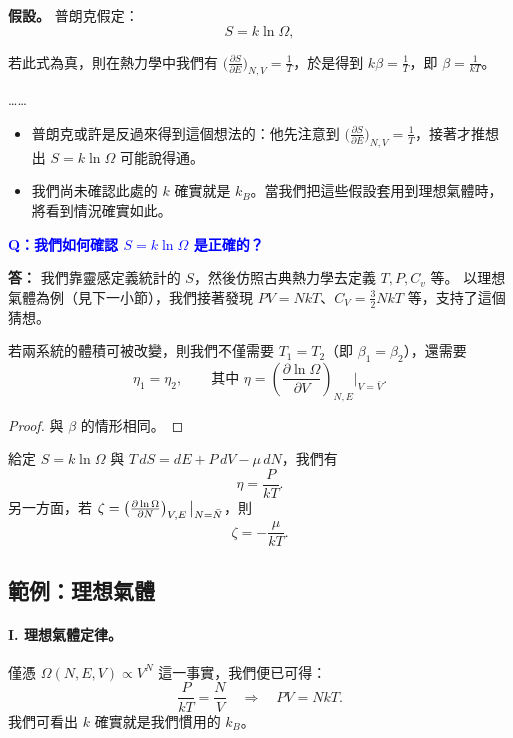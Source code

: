 \begin{framed}
    \textbf{假設。} 普朗克假定：
    \[
        S = k\ln\Omega,
    \]
\end{framed}
若此式為真，則在熱力學中我們有 $\bigl(\frac{\partial S}{\partial E}\bigr)_{N,V} = \frac{1}{T}$，於是得到 $k\beta = \tfrac{1}{T}$，即 $\beta = \tfrac{1}{kT}$。

\begin{remark}
    ……
    \begin{itemize}
        \item 普朗克或許是反過來得到這個想法的：他先注意到 $\bigl(\frac{\partial S}{\partial E}\bigr)_{N,V} = \frac{1}{T}$，接著才推想出 $S = k\ln\Omega$ 可能說得通。
        \item 我們尚未確認此處的 $k$ 確實就是 $k_B$。當我們把這些假設套用到理想氣體時，將看到情況確實如此。
    \end{itemize}
\end{remark}

\textbf{\textcolor{blue}{Q：我們如何確認 $S=k\ln\Omega$ 是正確的？}}

\textbf{答：} 我們靠靈感定義統計的 $S$，然後仿照古典熱力學去定義 $T,P,C_v$ 等。
以理想氣體為例（見下一小節），我們接著發現 $PV=NkT$、$C_V=\frac{3}{2}NkT$ 等，支持了這個猜想。

\begin{proposition}
若兩系統的體積可被改變，則我們不僅需要 $T_1=T_2$（即 $\beta_1=\beta_2$），還需要
\[
    \eta_1 = \eta_2,\qquad \text{其中 } \eta = \left(\frac{\partial\ln\Omega}{\partial V}\right)_{N,E}\bigg|_{V=\bar V}.
\]
\end{proposition}

\begin{proof}
與 $\beta$ 的情形相同。
\end{proof}

\begin{proposition}
給定 $S=k\ln\Omega$ 與 $T\,dS = dE + P\,dV - \mu\,dN$，我們有
\[
    \eta = \frac{P}{kT}.
\]
另一方面，若 $\zeta = \left(\frac{\partial\ln\Omega}{\partial N}\right)_{V,E}\big|_{N=\bar{N}}$，則
\[
    \zeta = -\frac{\mu}{kT}.
\]
\end{proposition}

\subsection{範例：理想氣體}

\paragraph{I. 理想氣體定律。}
僅憑 $\Omega(N,E,V)\propto V^{N}$ 這一事實，我們便已可得：
\[
    \frac{P}{kT} = \frac{N}{V} \quad\Longrightarrow\quad PV = NkT.
\]
我們可看出 $k$ 確實就是我們慣用的 $k_B$。

